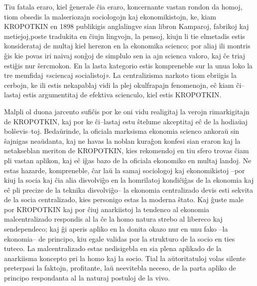 Tiu fatala eraro, kiel ĝenerale ĉia eraro, koncernante vastan rondon da homoj, tiom obsedis la malseriozajn sociologojn kaj ekonomikistojn, ke, kiam KROPOTKIN en 1898 publikigis anglalingve sian libron Kamparoj, fabrikoj kaj metiejoj,poste tradukita en ĉiujn lingvojn, la pensoj, kiujn li tie elmetadis estis konsiderataj de multaj kiel herezon en la ekonomika scienco; por aliaj ili montris ĝis kie povas iri naivaj sonĝoj de simplulo sen ia ajn scienca valoro, kaj ĉe triaj estiĝis nur ŝercmokon. En la lasta kategorio estis kompreneble sur la unua loko la tre memfidaj «sciencaj socialistoj». La centralizisma narkoto tiom ebriigis la cerbojn, ke ili estis nekapablaj vidi la plej okulfrapajn fenomenojn, eĉ kiam ĉi–lastaj estis argumentitaj de efektiva scienculo, kiel estis KROPOTKIN.

Malpli ol duona jarcento sufiĉis por ke oni vidu realigitaj la verojn rimarkigitajn de KROPOTKIN, kaj por ke ĉi–lastaj estu ŝtelume akceptitaj eĉ de la hodiaŭaj bolŝevis–toj. Bedaŭrinde, la oficiala marksisma ekonomia scienco ankoraŭ sin ŝajnigas neaŭdanta, kaj ne havas la noblan kuraĝon konfesi sian eraron kaj la netakseblan meriton de KROPOTKIN, kies rekomendoj en tiu sfero trovas ĉiam pli vastan aplikon, kaj eĉ iĝas bazo de la oficiala ekonomiko en multaj landoj. Ne estas hazarde, kompreneble, ĉar laŭ la samaj sociologoj kaj ekonomikistoj –por kiuj la socia kaj ĉia alia disvolviĝo en la homrilatoj kondiĉiĝas de la ekonomia kaj eĉ pli precize de la teknika disvolviĝo– la ekonomia centralizado devis esti sekvita de la socia centralizado, kies personigo estas la moderna ŝtato. Kaj ĝuste male por KROPOTKIN kaj por ĉiuj anarkiistoj la tendenco al ekonomia malcentralizado respondis al la ĉe la homo natura strebo al libereco kaj sendependeco; kaj ĝi aperis apliko en la donita okazo nur en unu fako –la ekonomia– de principo, kiu egale validas por la strukturo de la socio en ties tuteco. La malcentralizado estas nedisigebla en sia plena aplikado de la anarkiisma koncepto pri la homo kaj la socio. Tial la aŭtoritatuloj volas silente preterpasi la faktojn, profitante, laŭ neevitebla neceso, de la parta apliko de principo respondanta al la naturaj postuloj de la vivo.

